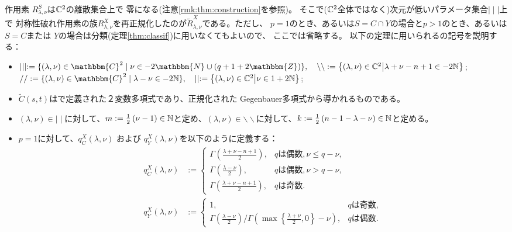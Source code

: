 \documentclass[12pt]{article} %
\newcommand{\tisevenjap}{\mbox{は偶数}}
\newcommand{\tisoddjap}{\mbox{は奇数}}
\newcommand{\assign}{:=}
\theoremstyle{definition}
\theoremstyle{exampstyle} \newtheorem{examp}[theorem]{Theorem}
\newcommand{\bb}{\backslash\backslash}
\begin{document}
作用素
$R_{\lambda,\nu}^S$は$\mathbb{C}^2$の離散集合上で
零になる(注意\ref{rmk:thm:construction}を参照)。
{そこで($\mathbb{C}^2$全体ではなく)次元が低いパラメータ集合$\mid\mid\mid$上で}
	対称性破れ作用素の族$R_{\lambda,\nu}^X$を再正規化したのが$\tilde{R}_{\lambda,\nu}^X$である。ただし、
	$p=1$のとき、あるいは$S=C\cap Y$の場合と$p>1$のとき、あるいは$S=C$または
$Y$の場合は分類(定理\ref{thm:classif})に用いなくてもよいので、
ここでは省略する。
以下の定理に用いられるの記号を説明する：
\begin{itemize}
	\item $\mid \mid \mid \assign \{ (\lambda, \nu) \in \mathbbm{C}^2 \mid \nu \in
	- 2\mathbbm{N} \cup (q + 1 + 2\mathbbm{Z}) \},\quad \backslash\backslash:=\mysetn{(\lambda,\nu)\in\C^2}{\lambda+\nu-n+1\in-2\N}$;\\
$/ / \assign
\{ (\lambda, \nu) \in \mathbbm{C}^2 \mid \lambda - \nu \in
-2\N \},\quad \mid\mid:=\mysetn{(\lambda,\nu)\in\C^2}{\nu\in1+2\N}$;
\item $\tilde{C}(s,t)$は\cite[(6.5)]{Kobayashi2016}で定義された２変数多項式であり、正規化された
	Gegenbauer多項式から導かれるものである。
\item 
$(\lambda,\nu)\in\mid\mid$に対して、$m:=\frac{1}{2}\left( \nu-1 \right)\in\mathbb{N}$と定め、$(\lambda,\nu)\in\bb$に対して、$k:=\frac{1}{2}\left( n-1-\lambda-\nu \right)\in\mathbb{N}$と定める。
\item 
$p=1$に対して、$q_C^X(\lambda,\nu)$ および $q_Y^X(\lambda,\nu)$を以下のように定義する：
\begin{align*}
 q_C^X (\lambda, \nu) &:= \left\{ \begin{array}{ll}
     \Gamma^{} \left( \frac{\lambda + \nu - n + 1}{2} \right), & q\tisevenjap
     , \nu \leqslant q - \nu,\\
     \Gamma^{} \left( \frac{\lambda - \nu}{2} \right), & q\tisevenjap,
     \nu > q - \nu,\\
     \Gamma \left( \frac{\lambda + \nu - n + 1}{2} \right), & q\tisoddjap
     .
   \end{array} \right.\\
q_Y^X (\lambda, \nu) &:= \left\{ \begin{array}{ll}
     1, & 
      q \tisoddjap,\\
      \Gamma \left( \frac{\lambda -
     \nu}{2} \right) / \Gamma \left( \max \left\{ \frac{\lambda + \nu}{2}, 0
     \right\} - \nu \right), & q
     \tisevenjap.
   \end{array} \right.
\end{align*}
\end{itemize}
\end{document}
